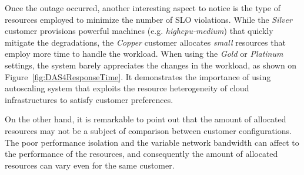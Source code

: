 Once the outage occurred, another interesting aspect to notice is the type of resources employed to minimize the number of SLO violations. While the \emph{Silver} customer provisions powerful machines (e.g. \emph{highcpu-medium}) that quickly mitigate the degradations, the \emph{Copper} customer allocates \emph{small} resources that employ more time to handle the workload. When using the \emph{Gold} or \emph{Platinum} settings, the system barely appreciates the changes in the workload, as shown on Figure~\ref{fig:DAS4ResponseTime}. It demonstrates the importance of using autoscaling system that exploits the resource heterogeneity of cloud infrastructures to satisfy customer preferences.


On the other hand, it is remarkable to point out that the amount of allocated resources may not be a subject of comparison between customer configurations. The poor performance isolation and the variable network bandwidth can affect to the performance of the resources, and consequently the amount of allocated resources can vary even for the same customer.



\setcounter{figure}{7}

